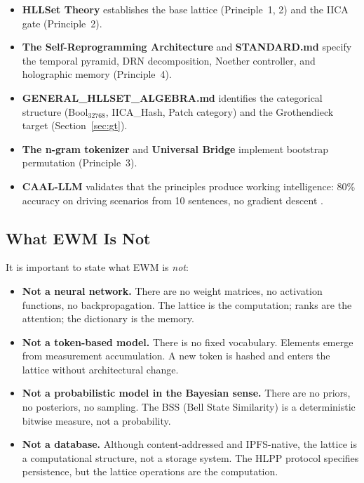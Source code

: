 \documentclass[11pt,a4paper]{article}
\theoremstyle{remark}
\begin{document}
\begin{itemize}[leftmargin=*,nosep]
  \item \textbf{HLLSet Theory} \cite{astesj2026} establishes the base lattice
    (Principle~1, 2) and the IICA gate (Principle~2).
  \item \textbf{The Self-Reprogramming Architecture} and \textbf{STANDARD.md} specify
    the temporal pyramid, DRN decomposition, Noether controller, and holographic memory
    (Principle~4).
  \item \textbf{GENERAL\_HLLSET\_ALGEBRA.md} identifies the categorical structure
    (Bool$_{32768}$, IICA\_Hash, Patch category) and the Grothendieck target
    (Section~\ref{sec:gt}).
  \item \textbf{The n-gram tokenizer} and \textbf{Universal Bridge} implement
    bootstrap permutation (Principle~3).
  \item \textbf{CAAL-LLM} validates that the principles produce working intelligence:
    80\% accuracy on driving scenarios from 10 sentences, no gradient descent
    \cite{astesj2026}.
\end{itemize}

\subsection{What EWM Is Not}

It is important to state what EWM is \textit{not}:

\begin{itemize}[leftmargin=*,nosep]
  \item \textbf{Not a neural network.} There are no weight matrices, no activation
    functions, no backpropagation. The lattice is the computation; ranks are the
    attention; the dictionary is the memory.
  \item \textbf{Not a token-based model.} There is no fixed vocabulary. Elements emerge
    from measurement accumulation. A new token is hashed and enters the lattice without
    architectural change.
  \item \textbf{Not a probabilistic model in the Bayesian sense.} There are no
    priors, no posteriors, no sampling. The BSS (Bell State Similarity) is a
    deterministic bitwise measure, not a probability.
  \item \textbf{Not a database.} Although content-addressed and IPFS-native, the
    lattice is a computational structure, not a storage system. The HLPP protocol
    specifies persistence, but the lattice operations are the computation.
\end{itemize}
\end{document}
